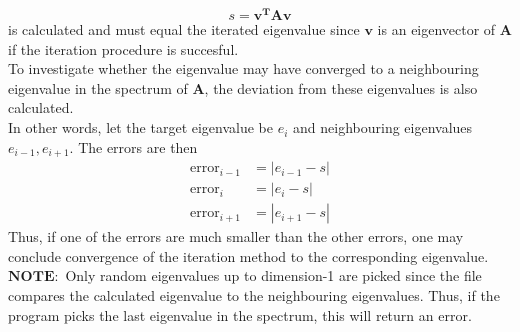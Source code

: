 \documentclass{article}
\begin{document}
	\begin{equation}
		s = \mathbf{v^{T}Av}
	\end{equation}
	is calculated and must equal the iterated eigenvalue since $\mathbf{v}$ is an eigenvector of $\mathbf{A}$ if the iteration procedure is succesful.\\
	To investigate whether the eigenvalue may have converged to a neighbouring eigenvalue in the spectrum of $\mathbf{A}$, the deviation from these eigenvalues is also calculated.\\
	In other words, let the target eigenvalue be $e_{i}$ and neighbouring eigenvalues $e_{i-1},e_{i+1}$. The errors are then
	\begin{align}
		\mathrm{error}_{i-1} &= |e_{i-1} - s| \\
		\mathrm{error}_{i} &= |e_{i} - s| \\		
		\mathrm{error}_{i+1} &= |e_{i+1} - s|
	\end{align}
	Thus, if one of the errors are much smaller than the other errors, one may conclude convergence of the iteration method to the corresponding eigenvalue.\\
	$\mathbf{NOTE:}$ Only random eigenvalues up to dimension-1 are picked since the file compares the calculated eigenvalue to the neighbouring eigenvalues. Thus, if the program picks the last eigenvalue in the spectrum, this will return an error.
\end{document}
